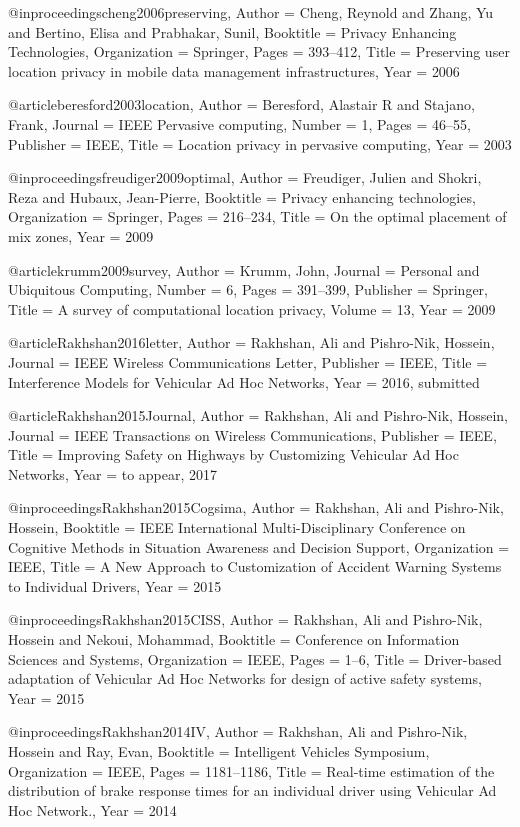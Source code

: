 {{{{{{{{{@inproceedings{cheng2006preserving,
	Author = {Cheng, Reynold and Zhang, Yu and Bertino, Elisa and Prabhakar, Sunil},
	Booktitle = {Privacy Enhancing Technologies},
	Organization = {Springer},
	Pages = {393--412},
	Title = {Preserving user location privacy in mobile data management infrastructures},
	Year = {2006}}

@article{beresford2003location,
	Author = {Beresford, Alastair R and Stajano, Frank},
	Journal = {IEEE Pervasive computing},
	Number = {1},
	Pages = {46--55},
	Publisher = {IEEE},
	Title = {Location privacy in pervasive computing},
	Year = {2003}}

@inproceedings{freudiger2009optimal,
	Author = {Freudiger, Julien and Shokri, Reza and Hubaux, Jean-Pierre},
	Booktitle = {Privacy enhancing technologies},
	Organization = {Springer},
	Pages = {216--234},
	Title = {On the optimal placement of mix zones},
	Year = {2009}}

@article{krumm2009survey,
	Author = {Krumm, John},
	Journal = {Personal and Ubiquitous Computing},
	Number = {6},
	Pages = {391--399},
	Publisher = {Springer},
	Title = {A survey of computational location privacy},
	Volume = {13},
	Year = {2009}}

@article{Rakhshan2016letter,
	Author = {Rakhshan, Ali and Pishro-Nik, Hossein},
	Journal = {IEEE Wireless Communications Letter},
	Publisher = {IEEE},
	Title = {Interference Models for Vehicular Ad Hoc Networks},
	Year = {2016, submitted}}

@article{Rakhshan2015Journal,
	Author = {Rakhshan, Ali and Pishro-Nik, Hossein},
	Journal = {IEEE Transactions on Wireless Communications},
	Publisher = {IEEE},
	Title = {Improving Safety on Highways by Customizing Vehicular Ad Hoc Networks},
	Year = {to appear, 2017}}

@inproceedings{Rakhshan2015Cogsima,
	Author = {Rakhshan, Ali and Pishro-Nik, Hossein},
	Booktitle = {IEEE International Multi-Disciplinary Conference on Cognitive Methods in Situation Awareness and Decision Support},
	Organization = {IEEE},
	Title = {A New Approach to Customization of Accident Warning Systems to Individual Drivers},
	Year = {2015}}

@inproceedings{Rakhshan2015CISS,
	Author = {Rakhshan, Ali and Pishro-Nik, Hossein and Nekoui, Mohammad},
	Booktitle = {Conference on Information Sciences and Systems},
	Organization = {IEEE},
	Pages = {1--6},
	Title = {Driver-based adaptation of Vehicular Ad Hoc Networks for design of active safety systems},
	Year = {2015}}

@inproceedings{Rakhshan2014IV,
	Author = {Rakhshan, Ali and Pishro-Nik, Hossein and Ray, Evan},
	Booktitle = {Intelligent Vehicles Symposium},
	Organization = {IEEE},
	Pages = {1181--1186},
	Title = {Real-time estimation of the distribution of brake response times for an individual driver using Vehicular Ad Hoc Network.},
	Year = {2014}}

}}}}}}}}}
